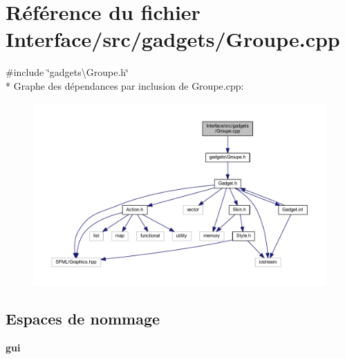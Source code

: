 \section{Référence du fichier Interface/src/gadgets/\+Groupe.cpp}
\label{_groupe_8cpp}
{\ttfamily \#include \char`\"{}gadgets\textbackslash{}\+Groupe.\+h\char`\"{}}\\*
Graphe des dépendances par inclusion de Groupe.\+cpp\+:\nopagebreak
\begin{figure}[H]
\begin{center}
\leavevmode
\includegraphics[width=350pt]{_groupe_8cpp__incl}
\end{center}
\end{figure}
\subsection*{Espaces de nommage}
\begin{DoxyCompactItemize}
\item 
 {\bf gui}
\end{DoxyCompactItemize}
